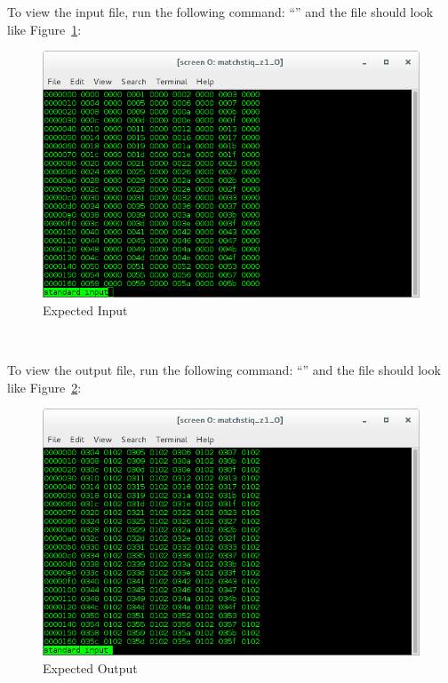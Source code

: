 \begin{minipage}{\linewidth}
To view the input file, run the following command: ``'' and the file should look like Figure~\ref{fig:inBias1}: \\ \medskip
\begin{figure}[H]
	\centerline{\includegraphics[scale=0.5]{Matchstiq_Z1_bias_input}}
	\caption{Expected Input}
	\label{fig:inBias1}
\end{figure}
\end{minipage}
~\\

\begin{minipage}{\linewidth}
To view the output file, run the following command: ``'' and the file should look like Figure~\ref{fig:outBias1}: \\
\begin{figure}[H]
	\centerline{\includegraphics[scale=0.5]{Matchstiq_Z1_bias_output}}
	\caption{Expected Output}
	\label{fig:outBias1}
\end{figure}
\end{minipage}
~\\
\newpage
